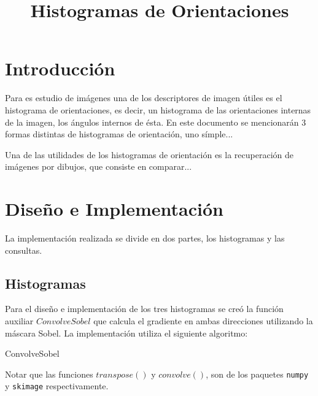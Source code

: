 \documentclass[conference]{IEEEtran}
\begin{document}
\title{Histogramas de Orientaciones}
\author{
}


\maketitle

\begin{abstract}
    
\end{abstract}
 

\section*{Introducción} %
    Para es estudio de imágenes una de los descriptores de imagen útiles es el histograma de orientaciones, es decir, un histograma de las orientaciones internas de la imagen, los ángulos internos de ésta. En este documento se mencionarán 3 formas distintas de histogramas de orientación, uno símple...
    
    Una de las utilidades de los histogramas de orientación es la recuperación de imágenes por dibujos, que consiste en comparar...
    
\section*{Diseño e Implementación}
	La implementación realizada se divide en dos partes, los histogramas y las consultas.
\subsection*{Histogramas}
	Para el diseño e implementación de los tres histogramas se creó la función auxiliar $ConvolveSobel$ que calcula el gradiente en ambas direcciones utilizando la máscara Sobel. La implementación utiliza el siguiente algoritmo: 

\begin{algorithm}
	\caption{ConvolveSobel}	
	\DontPrintSemicolon
	Notar que las funciones $transpose()$ y $convolve()$, son de los paquetes \texttt{numpy} y \texttt{skimage} respectivamente.
\end{algorithm}
		
\end{document}
